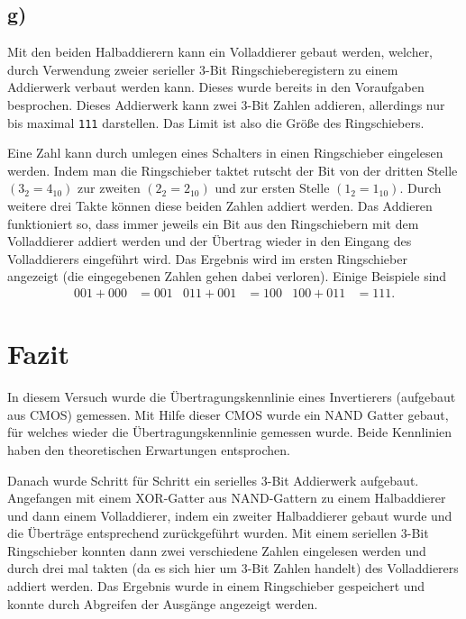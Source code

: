 \documentclass[10pt]{article}
\begin{document}
\begin{multicols}{2}
        \subsection{g)}
        Mit den beiden Halbaddierern kann ein Volladdierer gebaut werden, welcher, durch Verwendung zweier serieller 3-Bit Ringschieberegistern zu einem Addierwerk verbaut werden kann.
        Dieses wurde bereits in den Voraufgaben besprochen.
        Dieses Addierwerk kann zwei 3-Bit Zahlen addieren, allerdings nur bis maximal \texttt{111} darstellen.
        Das Limit ist also die Größe des Ringschiebers.
        \par Eine Zahl kann durch umlegen eines Schalters in einen Ringschieber eingelesen werden.
        Indem man die Ringschieber taktet \glqq rutscht\grqq{} der Bit von der dritten Stelle $\left(3_2=4_{10}\right)$ zur zweiten $\left(2_2=2_{10}\right)$ und zur ersten Stelle $\left(1_2=1_{10}\right)$.
        Durch weitere drei Takte können diese beiden Zahlen addiert werden.
        Das Addieren funktioniert so, dass immer jeweils ein Bit aus den Ringschiebern mit dem Volladdierer addiert werden und der Übertrag wieder in den Eingang des Volladdierers eingeführt wird.
        Das Ergebnis wird im ersten Ringschieber angezeigt (die eingegebenen Zahlen gehen dabei verloren).
        Einige Beispiele sind
        \begin{align} 
                001+000&=001&011+001&=100&100+011&=111
        .\end{align} 
        
	\section{Fazit}
        In diesem Versuch wurde die Übertragungskennlinie eines Invertierers (aufgebaut aus CMOS) gemessen.
        Mit Hilfe dieser CMOS wurde ein NAND Gatter gebaut, für welches wieder die Übertragungskennlinie gemessen wurde.
        Beide Kennlinien haben den theoretischen Erwartungen entsprochen.
        \par Danach wurde Schritt für Schritt ein serielles 3-Bit Addierwerk aufgebaut.
        Angefangen mit einem XOR-Gatter aus NAND-Gattern zu einem Halbaddierer und dann einem Volladdierer, indem ein zweiter Halbaddierer gebaut wurde und die Überträge entsprechend zurückgeführt wurden.
        Mit einem seriellen 3-Bit Ringschieber konnten dann zwei verschiedene Zahlen eingelesen werden und durch drei mal takten (da es sich hier um 3-Bit Zahlen handelt) des Volladdierers addiert werden.
        Das Ergebnis wurde in einem Ringschieber gespeichert und konnte durch Abgreifen der Ausgänge angezeigt werden.
\end{multicols}
\end{document}
